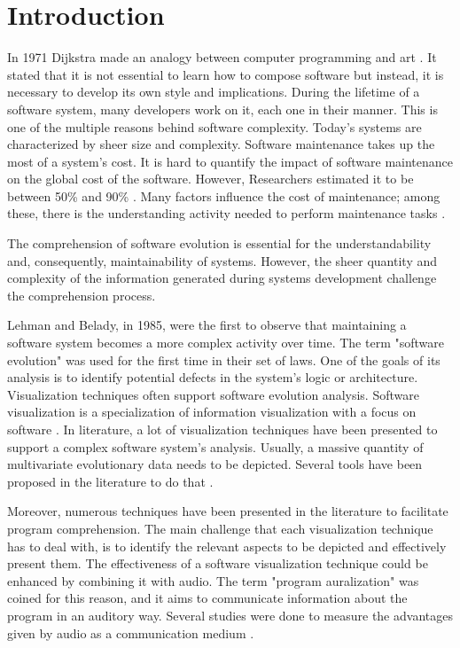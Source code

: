 \chapter{Introduction}

In 1971 Dijkstra made an analogy between computer programming and art \cite{Dijkstra1971a}.
It stated that it is not essential to learn how to compose software but instead, it is necessary to develop its own style and implications. 
During the lifetime of a software system, many developers work on it, each one in their manner. This is one of the multiple reasons behind software complexity. 
Today's systems are characterized by sheer size and complexity. Software maintenance takes up the most of a system's cost. 
It is hard to quantify the impact of software maintenance on the global cost of the software. 
However, Researchers estimated it to be between 50\% and 90\% \cite{Davis1995} \cite{Sommerville1995}\cite{Erlikh2000} \cite{seacord2003}.
Many factors influence the cost of maintenance; among these, there is the understanding activity needed to perform maintenance tasks \cite{Corbi1989}. 

The comprehension of software evolution is essential for the understandability and, consequently, maintainability of systems.
However, the sheer quantity and complexity of the information generated during systems development challenge the comprehension process.

Lehman and Belady, in 1985, were the first to observe that maintaining a software system becomes a more complex activity over time. \cite{Lehman1985}
The term "software evolution" was used for the first time in their set of laws. 
One of the goals of its analysis is to identify potential defects in the system's logic or architecture. 
Visualization techniques often support software evolution analysis.
\bigbreak
Software visualization is a specialization of information visualization with a focus on software \cite{Lanza2003}. In literature, a lot of visualization techniques have been presented to support 
a complex software system's analysis.
Usually, a massive quantity of multivariate evolutionary data needs to be depicted. Several tools have been proposed in the literature to do that \cite{Merino2018a}.

Moreover, numerous techniques have been presented in the literature to facilitate program comprehension. 
The main challenge that each visualization technique has to deal with, is to identify the relevant aspects to be depicted and effectively present them. 
The effectiveness of a software visualization technique could be enhanced by combining it with audio. 
The term "program auralization" was coined for this reason, and it aims to communicate information about the program in an auditory way.
Several studies were done to measure the advantages given by audio as a communication medium \cite{Alty1995}. 


